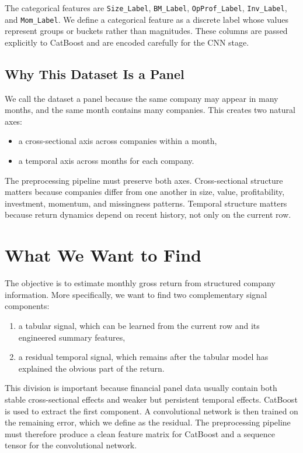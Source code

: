 \documentclass[11pt]{article}
\begin{document}
The categorical features are \texttt{Size\_Label}, \texttt{BM\_Label}, \texttt{OpProf\_Label}, \texttt{Inv\_Label}, and \texttt{Mom\_Label}. We define a categorical feature as a discrete label whose values represent groups or buckets rather than magnitudes. These columns are passed explicitly to CatBoost and are encoded carefully for the CNN stage.

\subsection{Why This Dataset Is a Panel}

We call the dataset a panel because the same company may appear in many months, and the same month contains many companies. This creates two natural axes:
\begin{itemize}
    \item a cross-sectional axis across companies within a month,
    \item a temporal axis across months for each company.
\end{itemize}

The preprocessing pipeline must preserve both axes. Cross-sectional structure matters because companies differ from one another in size, value, profitability, investment, momentum, and missingness patterns. Temporal structure matters because return dynamics depend on recent history, not only on the current row.

\section{What We Want to Find}

The objective is to estimate monthly gross return from structured company information. More specifically, we want to find two complementary signal components:
\begin{enumerate}
    \item a tabular signal, which can be learned from the current row and its engineered summary features,
    \item a residual temporal signal, which remains after the tabular model has explained the obvious part of the return.
\end{enumerate}

This division is important because financial panel data usually contain both stable cross-sectional effects and weaker but persistent temporal effects. CatBoost is used to extract the first component. A convolutional network is then trained on the remaining error, which we define as the residual. The preprocessing pipeline must therefore produce a clean feature matrix for CatBoost and a sequence tensor for the convolutional network.
\end{document}

